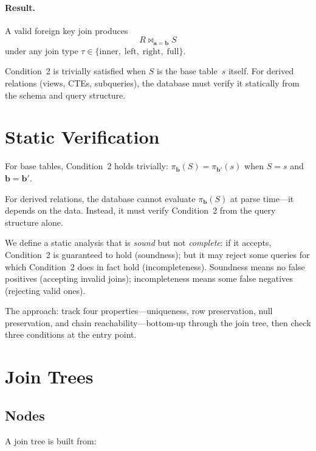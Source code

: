 \documentclass[11pt]{article}
\theoremstyle{definition}
\newcommand{\joins}{\bowtie}
\begin{document}
\paragraph{Result.}
A valid foreign key join produces
\[
  R \joins_{\mathbf{a}=\mathbf{b}} S
\]
under any join type
$\tau \in \{\text{inner},\;\text{left},\;\text{right},\;\text{full}\}$.

Condition~2 is trivially satisfied when $S$ is the base table~$s$
itself.  For derived relations (views, CTEs, subqueries), the database
must verify it statically from the schema and query structure.


\section{Static Verification}

For base tables, Condition~2 holds trivially:
$\pi_{\mathbf{b}}(S) = \pi_{\mathbf{b'}}(s)$ when $S = s$ and
$\mathbf{b} = \mathbf{b'}$.

For derived relations, the database cannot evaluate $\pi_{\mathbf{b}}(S)$
at parse time---it depends on the data.  Instead, it must verify
Condition~2 from the query structure alone.

We define a static analysis that is \emph{sound} but not
\emph{complete}: if it accepts, Condition~2 is guaranteed to hold
(soundness); but it may reject some queries for which Condition~2 does
in fact hold (incompleteness).  Soundness means no false positives
(accepting invalid joins); incompleteness means some false negatives
(rejecting valid ones).

The approach: track four properties---uniqueness, row preservation,
null preservation, and chain reachability---bottom-up through the join
tree, then check three conditions at the entry point.


\section{Join Trees}

\subsection{Nodes}

A join tree is built from:
\end{document}
